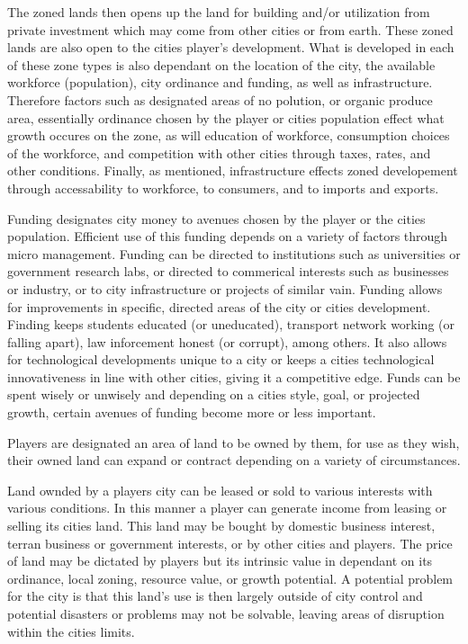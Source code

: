 The zoned lands then opens up the land for building and/or utilization from private investment which may come from other cities or from earth. These zoned lands are also open to the cities player's development. 
What is developed in each of these zone types is also dependant on the location of the city, the available workforce (population), city ordinance and funding, as well as infrastructure. Therefore factors such as designated areas of no polution, or organic produce area, essentially ordinance chosen by the player or cities population effect what growth occures on the zone, as will education of workforce, consumption choices of the workforce, and competition with other cities through taxes, rates, and other conditions. Finally, as mentioned, infrastructure effects zoned developement through accessability to workforce, to consumers, and to imports and exports.



Funding designates city money to avenues chosen by the player or the cities population. Efficient use of this funding depends on a variety of factors through micro management. Funding can be directed to institutions such as universities or government research labs, or directed to commerical interests such as businesses or industry, or to city infrastructure or projects of similar vain. Funding allows for improvements in specific, directed areas of the city or cities development. Finding keeps students educated (or uneducated), transport network working (or falling apart), law inforcement honest (or corrupt), among others. It also allows for technological developments unique to a city or keeps a cities technological innovativeness in line with other cities, giving it a competitive edge. Funds can be spent wisely or unwisely and depending on a cities style, goal, or projected growth, certain avenues of funding become more or less important.


Players are designated an area of land to be owned by them, for use as they wish, their owned land can expand or contract depending on a variety of circumstances. 

Land ownded by a players city can be leased or sold to various interests with various conditions. In this manner a player can generate income from leasing or selling its cities land. This land may be bought by domestic business interest, terran business or government interests, or by other cities and players. The price of land may be dictated by players but its intrinsic value in dependant on its ordinance, local zoning, resource value, or growth potential. %
A potential problem for the city is that this land's use is then largely outside of city control and potential disasters or problems may not be solvable, leaving areas of disruption within the cities limits.



